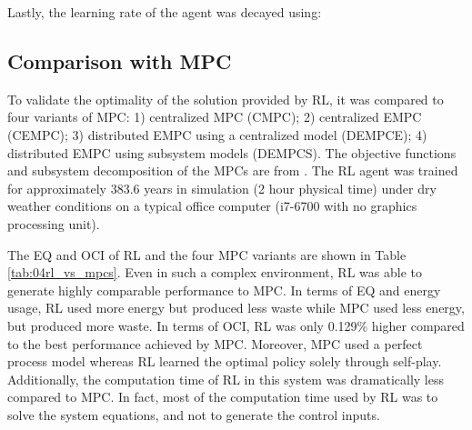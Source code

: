 Lastly, the learning rate of the agent was decayed using:
\begin{equation}
    
\end{equation}

\subsection{Comparison with MPC}
To validate the optimality of the solution provided by RL, it was compared to four variants of MPC: 1) centralized MPC (CMPC); 2) centralized EMPC (CEMPC); 3) distributed EMPC using a centralized model (DEMPCE); 4) distributed EMPC using subsystem models (DEMPCS).  The objective functions and subsystem decomposition of the MPCs are from \cite{an_mpc}.  The RL agent was trained for approximately 383.6 years in simulation (2 hour physical time) under dry weather conditions on a typical office computer (i7-6700 with no graphics processing unit).

The EQ and OCI of RL and the four MPC variants are shown in Table \ref{tab:04rl_vs_mpcs}.  Even in such a complex environment, RL was able to generate highly comparable performance to MPC. In terms of EQ and energy usage, RL used more energy but produced less waste while MPC used less energy, but produced more waste.  In terms of OCI, RL was only 0.129\% higher compared to the best performance achieved by MPC.  Moreover, MPC used a perfect process model whereas RL learned the optimal policy solely through self-play.  Additionally, the computation time of RL in this system was dramatically less compared to MPC. In fact, most of the computation time used by RL was to solve the system equations, and not to generate the control inputs.  

